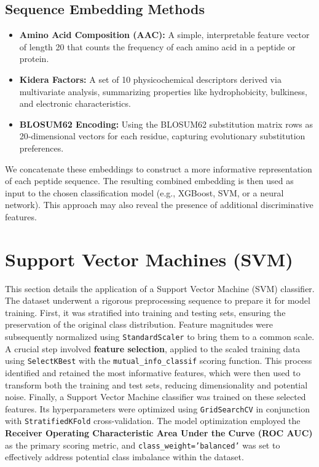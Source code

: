 \documentclass{article}
\begin{document}
\subsection{Sequence Embedding Methods}
\begin{itemize}
    \item \textbf{Amino Acid Composition (AAC):} A simple, interpretable feature vector of length 20 that counts the frequency of each amino acid in a peptide or protein.
    \item \textbf{Kidera Factors:} A set of 10 physicochemical descriptors derived via multivariate analysis, summarizing properties like hydrophobicity, bulkiness, and electronic characteristics.
    \item \textbf{BLOSUM62 Encoding:} Using the BLOSUM62 substitution matrix rows as 20‑dimensional vectors for each residue, capturing evolutionary substitution preferences.
\end{itemize}

We concatenate these embeddings to construct a more informative representation of each peptide sequence. The resulting combined embedding is then used as input to the chosen classification model (e.g., XGBoost, SVM, or a neural network). This approach may also reveal the presence of additional discriminative features.

\section{Support Vector Machines (SVM)}
This section details the application of a Support Vector Machine (SVM) classifier. The dataset underwent a rigorous preprocessing sequence to prepare it for model training. First, it was stratified into training and testing sets, ensuring the preservation of the original class distribution. Feature magnitudes were subsequently normalized using \texttt{StandardScaler} to bring them to a common scale. A crucial step involved \textbf{feature selection}, applied to the scaled training data using \texttt{SelectKBest} with the \texttt{mutual\_info\_classif} scoring function. This process identified and retained the most informative features, which were then used to transform both the training and test sets, reducing dimensionality and potential noise. Finally, a Support Vector Machine classifier was trained on these selected features. Its hyperparameters were optimized using \texttt{GridSearchCV} in conjunction with \texttt{StratifiedKFold} cross-validation. The model optimization employed the \textbf{Receiver Operating Characteristic Area Under the Curve (ROC AUC)} as the primary scoring metric, and \texttt{class\_weight='balanced'} was set to effectively address potential class imbalance within the dataset.
\end{document}
